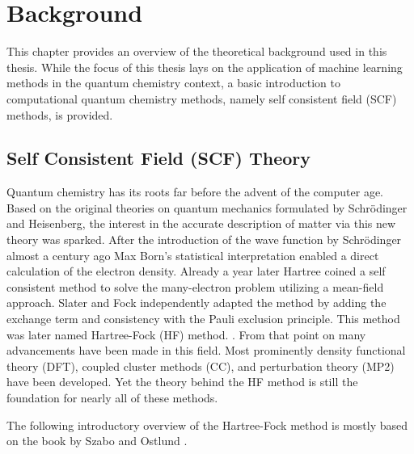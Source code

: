 \chapter{Background}
\label{sec:background}
This chapter provides an overview of the theoretical background used in this thesis. While the focus of this thesis lays on the application of machine learning methods in the quantum chemistry context, a basic introduction to computational quantum chemistry methods, namely self consistent field (SCF) methods, is provided. 

\section{Self Consistent Field (SCF) Theory}
\label{sec:background_scf}
Quantum chemistry has its roots far before the advent of the computer age. Based on the original theories on quantum mechanics formulated by Schrödinger and Heisenberg, the interest in the accurate description of matter via this new theory was sparked. After the introduction of the wave function by Schrödinger almost a century ago Max Born's statistical interpretation enabled a direct calculation of the electron density. \parencite{ref:schroedinger_1926undulatory} Already a year later Hartree coined a self consistent method to solve the many-electron problem utilizing a mean-field approach. Slater and Fock independently adapted the method by adding the exchange term and consistency with the Pauli exclusion principle. This method was later named Hartree-Fock (HF) method. \parencite{ref:Hartree_1928,ref:slater1930note,ref:fock1930naherungsmethode}. From that point on many advancements have been made in this field. Most prominently density functional theory (DFT), coupled cluster methods (CC), and perturbation theory (MP2) have been developed. Yet the theory behind the HF method is still the foundation for nearly all of these methods.

The following introductory overview of the Hartree-Fock method is mostly based on the book by Szabo and Ostlund \parencite{ref:szabo_ostlund}. 

